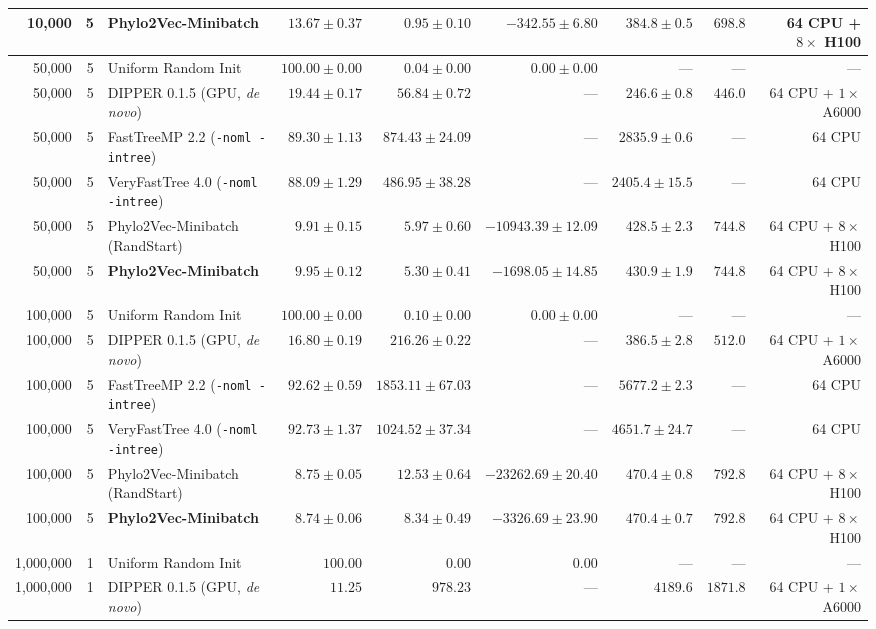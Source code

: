 \begin{table}[!htbp]
{\begin{tabular}{@{}rrlrrrrrr@{}}
10,000 & 5 & \textbf{Phylo2Vec-Minibatch} & $13.67 \pm 0.37$ & $\mathbf{0.95 \pm 0.10}$ & $-342.55 \pm 6.80$ & $384.8 \pm 0.5$ & $698.8$ & 64 CPU + $8\times$ H100\\
\midrule
50,000 & 5 & Uniform Random Init & $100.00 \pm 0.00$ & $0.04 \pm 0.00$ & $0.00 \pm 0.00$ & --- & --- & ---\\
50,000 & 5 & DIPPER 0.1.5 (GPU, \textit{de novo}) & $19.44 \pm 0.17$ & $56.84 \pm 0.72$ & --- & $246.6 \pm 0.8$ & $446.0$ & 64 CPU + $1\times$ A6000\\
50,000 & 5 & FastTreeMP 2.2 (\texttt{-noml -intree}) & $89.30 \pm 1.13$ & $874.43 \pm 24.09$ & --- & $2835.9 \pm 0.6$ & --- & 64 CPU\\
50,000 & 5 & VeryFastTree 4.0 (\texttt{-noml -intree}) & $88.09 \pm 1.29$ & $486.95 \pm 38.28$ & --- & $2405.4 \pm 15.5$ & --- & 64 CPU\\
50,000 & 5 & Phylo2Vec-Minibatch (RandStart) & $\mathbf{9.91 \pm 0.15}$ & $5.97 \pm 0.60$ & $-10943.39 \pm 12.09$ & $428.5 \pm 2.3$ & $744.8$ & 64 CPU + $8\times$ H100\\
50,000 & 5 & \textbf{Phylo2Vec-Minibatch} & $9.95 \pm 0.12$ & $\mathbf{5.30 \pm 0.41}$ & $-1698.05 \pm 14.85$ & $430.9 \pm 1.9$ & $744.8$ & 64 CPU + $8\times$ H100\\
\midrule
100,000 & 5 & Uniform Random Init & $100.00 \pm 0.00$ & $0.10 \pm 0.00$ & $0.00 \pm 0.00$ & --- & --- & ---\\
100,000 & 5 & DIPPER 0.1.5 (GPU, \textit{de novo}) & $16.80 \pm 0.19$ & $216.26 \pm 0.22$ & --- & $386.5 \pm 2.8$ & $512.0$ & 64 CPU + $1\times$ A6000\\
100,000 & 5 & FastTreeMP 2.2 (\texttt{-noml -intree}) & $92.62 \pm 0.59$ & $1853.11 \pm 67.03$ & --- & $5677.2 \pm 2.3$ & --- & 64 CPU\\
100,000 & 5 & VeryFastTree 4.0 (\texttt{-noml -intree}) & $92.73 \pm 1.37$ & $1024.52 \pm 37.34$ & --- & $4651.7 \pm 24.7$ & --- & 64 CPU\\
100,000 & 5 & Phylo2Vec-Minibatch (RandStart) & $8.75 \pm 0.05$ & $12.53 \pm 0.64$ & $-23262.69 \pm 20.40$ & $470.4 \pm 0.8$ & $792.8$ & 64 CPU + $8\times$ H100\\
100,000 & 5 & \textbf{Phylo2Vec-Minibatch} & $\mathbf{8.74 \pm 0.06}$ & $\mathbf{8.34 \pm 0.49}$ & $-3326.69 \pm 23.90$ & $470.4 \pm 0.7$ & $792.8$ & 64 CPU + $8\times$ H100\\
\midrule
1,000,000 & 1 & Uniform Random Init & $100.00$ & $0.00$ & $0.00$ & --- & --- & ---\\
1,000,000 & 1 & DIPPER 0.1.5 (GPU, \textit{de novo}) & $11.25$ & $978.23$ & --- & $4189.6$ & $1871.8$ & 64 CPU + $1\times$ A6000\\

\end{tabular}}
\end{table}
